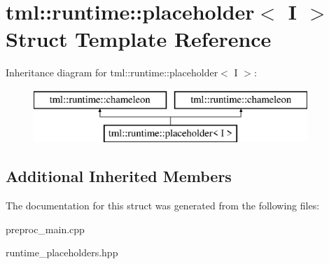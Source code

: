 \hypertarget{structtml_1_1runtime_1_1placeholder}{\section{tml\+:\+:runtime\+:\+:placeholder$<$ I $>$ Struct Template Reference}
\label{structtml_1_1runtime_1_1placeholder}
}
Inheritance diagram for tml\+:\+:runtime\+:\+:placeholder$<$ I $>$\+:\begin{figure}[H]
\begin{center}
\leavevmode
\includegraphics[height=2.000000cm]{structtml_1_1runtime_1_1placeholder}
\end{center}
\end{figure}
\subsection*{Additional Inherited Members}


The documentation for this struct was generated from the following files\+:\begin{DoxyCompactItemize}
\item 
preproc\+\_\+main.\+cpp\item 
runtime\+\_\+placeholders.\+hpp\end{DoxyCompactItemize}
